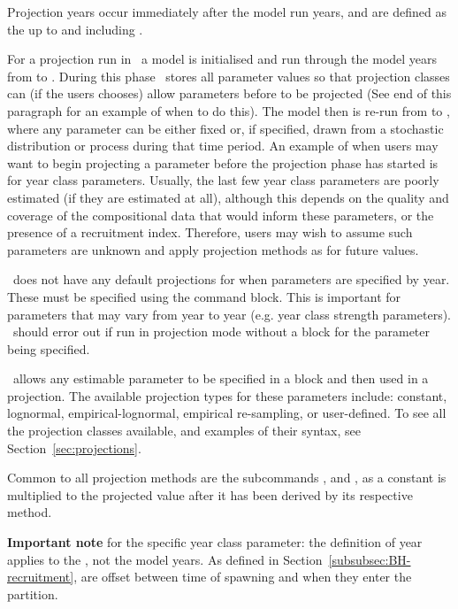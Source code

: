Projection years occur immediately after the model run years, and are defined as the  up to and including .

For a projection run in \CNAME\, a model is initialised and run through the model years from  to . During this phase \CNAME\ stores all parameter values so that projection classes can (if the users chooses) allow parameters before  to be projected (See end of this paragraph for an example of when to do this). The model then is re-run from  to , where any parameter can be either fixed or, if specified, drawn from a stochastic distribution or process during that time period. An example of when users may want to begin projecting a parameter before the projection phase has started is for year class parameters. Usually, the last few year class parameters are poorly estimated (if they are estimated at all), although this depends on the quality and coverage of the compositional data that would inform these parameters, or the presence of a recruitment index. Therefore, users may wish to assume such parameters are unknown and apply projection methods as for future values.

\CNAME\ does not have any default projections for when parameters are specified by year. These must be specified using the  command block. This is important for parameters that may vary from year to year (e.g. year class strength parameters). \CNAME\ should error out if run in projection mode without a  block for the  parameter being specified.

\CNAME\ allows any estimable parameter to be specified in a  block and then used in a projection. The available projection types for these parameters include: constant, lognormal, empirical-lognormal, empirical re-sampling, or user-defined. To see all the projection classes available, and examples of their syntax, see Section~\ref{sec:projections}.

Common to all projection methods are the subcommands ,  and , as a constant is multiplied to the projected value after it has been derived by its respective method.

\textbf{Important note} for the specific year class parameter: the definition of year applies to the , not the model years. As defined in Section~\ref{subsubsec:BH-recruitment},  are offset between time of spawning and when they enter the partition.

